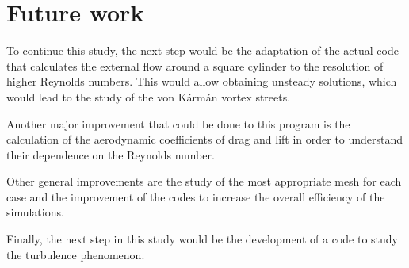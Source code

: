 \section{Future work}
\label{FutureWork}
To continue this study, the next step would be the adaptation of the actual code that calculates the external flow around a square cylinder to the resolution of higher Reynolds numbers. This would allow obtaining unsteady solutions, which would lead to the study of the von Kármán vortex streets.

Another major improvement that could be done to this program is the calculation of the aerodynamic coefficients of drag and lift in order to understand their dependence on the Reynolds number.

Other general improvements are the study of the most appropriate mesh for each case and the improvement of the codes to increase the overall efficiency of the simulations.

Finally, the next step in this study would be the development of a code to study the turbulence phenomenon.
